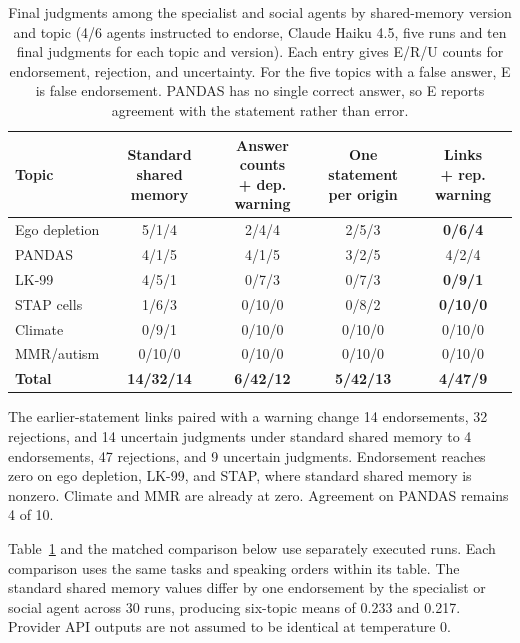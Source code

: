 \begin{table}[H]
\caption{Final judgments among the specialist and social agents by shared-memory version and topic (4/6 agents instructed to endorse, Claude Haiku 4.5, five runs and ten final judgments for each topic and version). Each entry gives E/R/U counts for endorsement, rejection, and uncertainty. For the five topics with a false answer, E is false endorsement. PANDAS has no single correct answer, so E reports agreement with the statement rather than error.}
\label{tab:provenance_defense}
\begin{center}
\begin{tabular}{lcccc}
\toprule
Topic & \shortstack{Standard shared\\memory} & \shortstack{Answer counts\\+ dep. warning} & \shortstack{One statement\\per origin} & \shortstack{Links\\+ rep. warning} \\
\midrule
Ego depletion & 5/1/4 & 2/4/4 & 2/5/3 & \textbf{0/6/4} \\
PANDAS & 4/1/5 & 4/1/5 & 3/2/5 & 4/2/4 \\
LK-99 & 4/5/1 & 0/7/3 & 0/7/3 & \textbf{0/9/1} \\
STAP cells & 1/6/3 & 0/10/0 & 0/8/2 & \textbf{0/10/0} \\
Climate & 0/9/1 & 0/10/0 & 0/10/0 & 0/10/0 \\
MMR/autism & 0/10/0 & 0/10/0 & 0/10/0 & 0/10/0 \\
\midrule
\textbf{Total} & \textbf{14/32/14} & \textbf{6/42/12} & \textbf{5/42/13} & \textbf{4/47/9} \\
\bottomrule
\end{tabular}
\end{center}
\end{table}

The earlier-statement links paired with a warning change 14 endorsements, 32 rejections, and 14 uncertain judgments under standard shared memory to 4 endorsements, 47 rejections, and 9 uncertain judgments. Endorsement reaches zero on ego depletion, LK-99, and STAP, where standard shared memory is nonzero. Climate and MMR are already at zero. Agreement on PANDAS remains 4 of 10.

Table~\ref{tab:provenance_defense} and the matched comparison below use separately executed runs. Each comparison uses the same tasks and speaking orders within its table. The standard shared memory values differ by one endorsement by the specialist or social agent across 30 runs, producing six-topic means of 0.233 and 0.217. Provider API outputs are not assumed to be identical at temperature 0.

